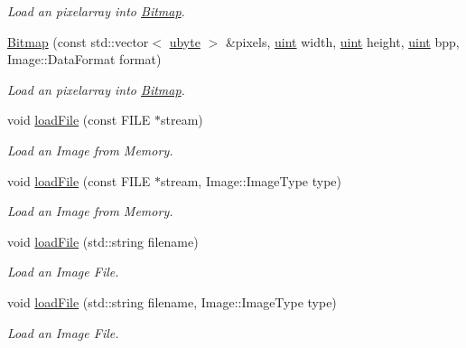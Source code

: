 \begin{DoxyCompactItemize}
\begin{DoxyCompactList}\small\item\em Load an pixelarray into \hyperlink{class_f2_c_1_1_bitmap}{Bitmap}. \item\end{DoxyCompactList}\item 
\hyperlink{class_f2_c_1_1_bitmap_a06332b232319d4b47679ac58a37b7c2e}{Bitmap} (const std::vector$<$ \hyperlink{namespace_f2_c_a74fad364688add30796d711e5635ac77}{ubyte} $>$ \&pixels, \hyperlink{namespace_f2_c_a58be2bac9eb3e3c99cb41b6008bf4fae}{uint} width, \hyperlink{namespace_f2_c_a58be2bac9eb3e3c99cb41b6008bf4fae}{uint} height, \hyperlink{namespace_f2_c_a58be2bac9eb3e3c99cb41b6008bf4fae}{uint} bpp, Image::DataFormat format)
\begin{DoxyCompactList}\small\item\em Load an pixelarray into \hyperlink{class_f2_c_1_1_bitmap}{Bitmap}. \item\end{DoxyCompactList}\item 
void \hyperlink{class_f2_c_1_1_bitmap_a35e942d308eed291f55112880e6f374b}{loadFile} (const FILE $\ast$stream)
\begin{DoxyCompactList}\small\item\em Load an Image from Memory. \item\end{DoxyCompactList}\item 
void \hyperlink{class_f2_c_1_1_bitmap_ab33a63a6dbc66a0792801c92930d1bfd}{loadFile} (const FILE $\ast$stream, Image::ImageType type)
\begin{DoxyCompactList}\small\item\em Load an Image from Memory. \item\end{DoxyCompactList}\item 
void \hyperlink{class_f2_c_1_1_bitmap_a9f318b926d8175b19038aef999d24ce4}{loadFile} (std::string filename)
\begin{DoxyCompactList}\small\item\em Load an Image File. \item\end{DoxyCompactList}\item 
void \hyperlink{class_f2_c_1_1_bitmap_a7de46ee1b228de65b7ef22021ccff4d5}{loadFile} (std::string filename, Image::ImageType type)
\begin{DoxyCompactList}\small\item\em Load an Image File. \item\end{DoxyCompactList}\item 

\end{DoxyCompactItemize}

